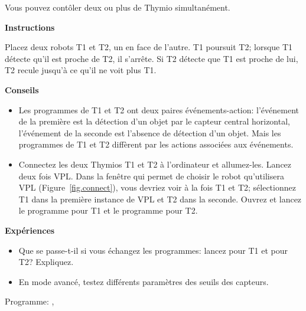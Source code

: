 \label{ch.two}

Vous pouvez contôler deux ou plus de Thymio simultanément.

\textbf{Instructions}

Placez deux robots T1 et T2, un en face de l'autre. T1 poursuit T2;
lorsque T1 détecte qu'il est proche de T2, il s'arrête.
Si T2 détecte que T1 est proche de lui, T2 recule jusqu'à ce qu'il ne voit plus T1.

\textbf{Conseils}

\begin{itemize}

\item Les programmes de T1 et T2 ont deux paires événements-action: l'événement de la première
est la détection d'un objet par le capteur central horizontal,
l'événement de la seconde est l'absence de détection d'un objet.
Mais les programmes de T1 et T2 diffèrent par les actions associées aux événements.

\item Connectez les deux Thymios T1 et T2 à l'ordinateur et allumez-les.
Lancez deux fois VPL. Dans la fenêtre qui permet de choisir le robot qu'utilisera VPL
(Figure~\ref{fig.connect}), vous devriez voir à la fois T1 et T2;
sélectionnez T1 dans la première instance de VPL et T2 dans la seconde.
Ouvrez et lancez le programme  pour T1 et le programme  pour T2.

\end{itemize}

\textbf{Expériences}

\begin{itemize}

\item Que se passe-t-il si vous échangez les programmes: lancez  pour T1 et  pour T2? Expliquez.

\item En mode avancé, testez différents paramètres des seuils des capteurs.

\end{itemize}

{\raggedleft \hfill Programme: , }

\bigskip

